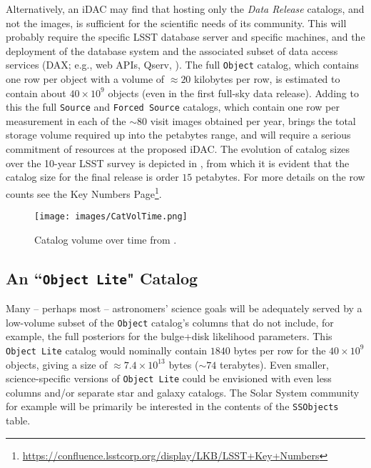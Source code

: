 Alternatively, an iDAC may find that hosting only the {\it Data Release} catalogs, and not the images, is sufficient for the scientific needs of its community. This will probably require the specific LSST database server  and specific machines, and the deployment of the database system and the associated subset of data access services (DAX; e.g., web APIs, Qserv, ). The full {\tt Object} catalog, which contains one row per object with a volume of $\approx 20$ kilobytes per row, is estimated to contain about $40 \times 10^9$ objects (even in the first full-sky data release). Adding to this the full {\tt Source} and {\tt Forced Source} catalogs, which contain one row per measurement in each of the $\sim80$ visit images obtained per year, brings the total storage volume required up into the petabytes range, and will require a serious commitment of resources at the proposed iDAC. The evolution of catalog sizes over the 10-year LSST survey is depicted in , from which it is evident that the catalog size for the final release is order $15$ petabytes. For more details on the row counts see the Key Numbers Page\footnote{\url{https://confluence.lsstcorp.org/display/LKB/LSST+Key+Numbers}}.

\begin{figure}
\begin{center}
\texttt{[image: images/CatVolTime.png]}
\caption{Catalog volume over time from . \label{fig:catvol}}
\end{center}
\end{figure}

\subsection{An ``{\tt Object Lite}" Catalog}\label{sec:lite}

Many -- perhaps most -- astronomers' science goals will be adequately served by a low-volume subset of the {\tt Object} catalog's columns that do not include, for example, the full posteriors for the bulge+disk likelihood parameters. 
This {\tt Object Lite} catalog would nominally contain $1840$ bytes per row for the $40 \times 10^{9}$ objects, giving a size of $\approx 7.4 \times 10^{13}$ bytes ($\sim74$ terabytes). 
Even smaller, science-specific versions of {\tt Object Lite} could be envisioned with even less columns and/or separate star and galaxy catalogs. 
The Solar System community for example will be primarily be interested in the contents of  the  {\tt SSObjects} table.  

